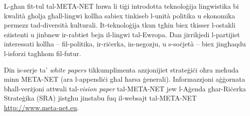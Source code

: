 \begin{multicols}{2}
L-għan fit-tul tal-META-NET huwa li tiġi introdotta teknoloġija lingwistika bi kwalità għolja għall-lingwi kollha sabiex tinkiseb l-unità politika u ekonomika permezz tad-diversità kulturali. It-teknoloġija tkun tgħin biex tkisser l-ostakli eżistenti u jinbnew ir-rabtiet bejn il-lingwi tal-Ewropa. Dan jirrikjedi l-partijiet interessati kollha – fil-politika, ir-riċerka, in-negozju, u s-soċjetà – biex jingħaqdu l-isforzi tagħhom fil-futur.

Din is-serje ta’ \emph{white papers} tikkumplimenta azzjonijiet strateġiċi oħra meħuda minn META-NET (ara l-appendiċi għal ħarsa ġenerali). Informazzjoni aġġornata bħall-verżjoni attwali tal-\emph{vision paper} \cite{Meta1}  tal-META-NET jew l-Aġenda għar-Riċerka Strateġika (SRA) jistgħu jinstabu fuq il-websajt tal-META-NET \url{http://www.meta-net.eu}.

\end{multicols}

\clearpage



